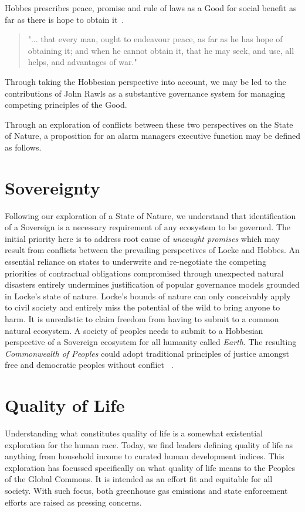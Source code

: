 \documentclass[11pt, oneside]{book}   	%
\begin{document}
Hobbes prescribes peace, promise and rule of laws as a Good for social benefit as far as there is hope to obtain it~\cite{th1}.

\begin{quote}
"... that every man, ought to endeavour peace, as far as he has hope of obtaining it; and when he cannot obtain it, that he may seek, and use, all helps, and advantages of war."
\end{quote}
Through taking the Hobbesian perspective into account, we may be led to the contributions of John Rawls as a substantive governance system for managing competing principles of the Good.\

Through an exploration of conflicts between these two perspectives on the State of Nature, a proposition for an alarm managers executive function may be defined as follows.\

\section{Sovereignty}
Following our exploration of a State of Nature, we understand that identification of a Sovereign is a necessary requirement of any ecosystem to be governed.
The initial priority here is to address root cause of \emph{uncaught promises} which may result from conflicts between the prevailing perspectives of Locke and Hobbes.
An essential reliance on states to underwrite and re-negotiate the competing priorities of contractual obligations compromised through unexpected natural disasters entirely undermines justification of popular governance models grounded in Locke's state of nature.
Locke's bounds of nature can only conceivably apply to civil society and entirely miss the potential of the wild to bring anyone to harm.
It is unrealistic to claim freedom from having to submit to a common natural ecosystem.
A society of peoples needs to submit to a Hobbesian perspective of a Sovereign ecosystem for all humanity called \emph{Earth}.
The resulting \emph{Commonwealth of Peoples} could adopt traditional principles of justice amongst free and democratic peoples without conflict ~\cite{jr2}.\

\section{Quality of Life}
Understanding what constitutes quality of life is a somewhat existential exploration for the human race.
Today, we find leaders defining quality of life as anything from household income to curated human development indices.
This exploration has focussed specifically on what quality of life means to the Peoples of the Global Commons.
It is intended as an effort fit and equitable for all society.
With such focus, both greenhouse gas emissions and state enforcement efforts are raised as pressing concerns.
\end{document}
